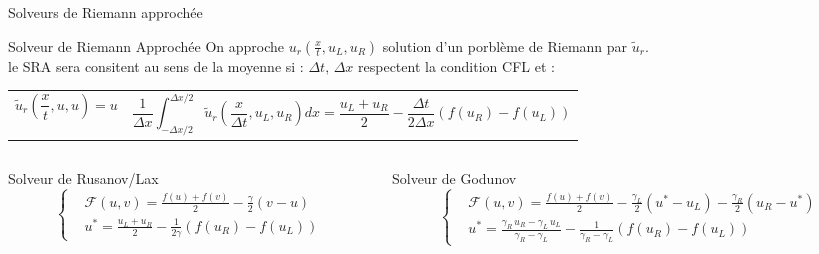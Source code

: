 \begin{frame}{Solveurs de Riemann approchée}

\begin{block}{Solveur de Riemann Approchée}
On approche ${u_r}(\frac{x}{t},u_L,u_R)$ solution d'un porblème de Riemann par $\widetilde{u}_r$.\\
le SRA sera consitent au sens de la moyenne si : $\Delta t,\, \Delta x$ respectent la condition CFL et :
\begin{tabular}{p{2.5cm}| p{7cm}}
\begin{equation}
    \widetilde{u}_r(\frac{x}{t},u,u)=u 
\end{equation}
&
\hspace{1cm}
\begin{equation}
    \frac{1}{\Delta x}\int_{-\Delta x/2}^{\Delta x/2} \widetilde{u}_r(\frac{x}{\Delta t},u_L,u_R) dx
    = \frac{u_L + u_R}{2} -\frac{\Delta t}{2\Delta x}\left(f(u_R)-f(u_L)\right)
\end{equation}
\end{tabular}
\end{block}

\begin{columns}

\begin{column}{0.4 \textwidth}
\begin{block}{Solveur de Rusanov/Lax}
\begin{equation}
    \left\{
    \begin{aligned}
        &\mathcal{F}(u,v) = \frac{f(u)+f(v)}{2} - \frac{\gamma}{2}(v-u) \\
        &u^* = \frac{u_L +u_R}{2} -\frac{1}{2\gamma}(f(u_R)-f(u_L))
    \end{aligned}
    \right.
\end{equation}
\end{block}
\end{column}

\begin{column}{0.55 \textwidth}
\begin{block}{Solveur de Godunov}
\begin{equation}
    \left\{
    \begin{aligned}
        &\mathcal{F}(u,v) = \frac{f(u)+f(v)}{2} - \frac{\gamma_L}{2}(u^*-u_L) -\frac{\gamma_R}{2}(u_R-u^*)  \\
        &u^* = \frac{\gamma_R\,u_R-\gamma_L\,u_L }{\gamma_R - \gamma_L} -\frac{1}{\gamma_R - \gamma_L}(f(u_R)-f(u_L))
    \end{aligned}
    \right.
\end{equation}
\end{block}
\end{column}

\end{columns}

\end{frame}
